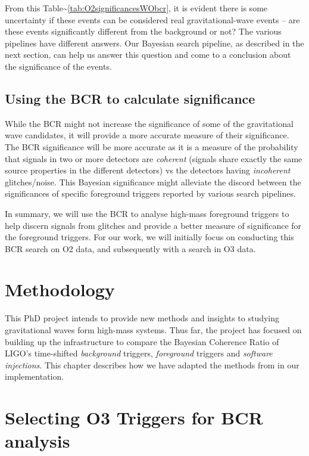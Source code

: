 \documentclass[%
 reprint,
 amsmath,amssymb,
 aps,
]{revtex4}
\begin{document}
From this Table\textasciitilde\ref{tab:O2significancesWObcr}, it is evident there is some uncertainty if these events can be considered real
gravitational-wave events -- are these events significantly different from the background or not? The various pipelines
have different answers. Our Bayesian search pipeline, as described in the next section, can help us answer this question
and come to a conclusion about the significance of the events.

\hypertarget{using-the-bcr-to-calculate-significance}{%
\subsection{Using the BCR to calculate significance}\label{using-the-bcr-to-calculate-significance}}

While the BCR might not increase the significance of some of the gravitational wave candidates, it will provide a more
accurate measure of their significance. The BCR significance will be more accurate as it is a measure of the probability
that signals in two or more detectors are \emph{coherent} (signals share exactly the same source properties in the different
detectors) vs the detectors having \emph{incoherent} glitches/noise. This Bayesian significance might alleviate the discord
between the significances of specific foreground triggers reported by various search pipelines.

In summary, we will use the BCR to analyse high-mass foreground triggers to help discern signals from glitches and
provide a better measure of significance for the foreground triggers. For our work, we will initially focus on
conducting this BCR search on O2 data, and subsequently with a search in O3 data.


\section{Methodology}\label{methodology}
This PhD project intends to provide new methods and insights to studying gravitational waves form high-mass systems.
Thus far, the project has focused on building up the infrastructure to compare the Bayesian Coherence Ratio of LIGO's
time-shifted \emph{background} triggers, \emph{foreground} triggers and \emph{software injections}. This chapter describes how we have
adapted the methods from \citet{bcr_paper} in our implementation.

\hypertarget{selecting-o3-triggers-for-bcr-analysis}{%
\section{Selecting O3 Triggers for BCR analysis}\label{selecting-o3-triggers-for-bcr-analysis}}
\end{document}
